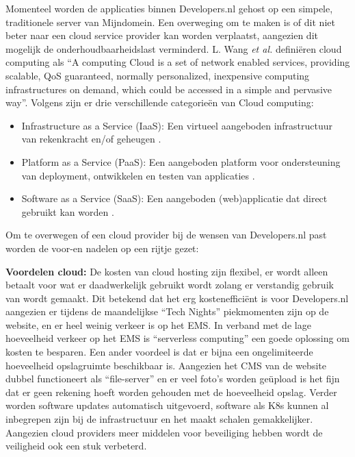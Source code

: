 Momenteel worden de applicaties binnen Developers.nl gehost op een simpele, traditionele server van Mijndomein. Een overweging om te maken is of dit niet beter naar een cloud service provider kan worden verplaatst, aangezien dit mogelijk de onderhoudbaarheidslast verminderd. L. Wang \textit{et al.} \parencite{CloudPerspective} definiëren cloud computing als \enquote{A computing Cloud is a set of network enabled services, providing scalable, QoS guaranteed, normally personalized, inexpensive computing infrastructures on demand, which could be accessed in a simple and pervasive way}. Volgens \parencite{CloudPlatformsIntroduction} zijn er drie verschillende categorieën van Cloud computing:
\begin{itemize}
	\item Infrastructure as a Service (IaaS): Een virtueel aangeboden infrastructuur van rekenkracht en/of geheugen \parencite{CloudComputingAdvantages}.
	\item Platform as a Service (PaaS): Een aangeboden platform voor ondersteuning van deployment, ontwikkelen en testen van applicaties \parencite{TransformingCloud}.
	\item Software as a Service (SaaS): Een aangeboden (web)applicatie dat direct gebruikt kan worden \parencite{CloudComputingAdvantages}.
\end{itemize}

Om te overwegen of een cloud provider bij de wensen van Developers.nl past worden de voor-en nadelen op een rijtje gezet:

\textbf{Voordelen cloud:} De kosten van cloud hosting zijn flexibel, er wordt alleen betaalt voor wat er daadwerkelijk gebruikt wordt zolang er verstandig gebruik van wordt gemaakt. Dit betekend dat het erg kostenefficiënt is voor Developers.nl aangezien er tijdens de maandelijkse \enquote{Tech Nights} piekmomenten zijn op de website, en er heel weinig verkeer is op het EMS. In verband met de lage hoeveelheid verkeer op het EMS is \enquote{serverless computing} een goede oplossing om kosten te besparen. Een ander voordeel is dat er bijna een ongelimiteerde hoeveelheid opslagruimte beschikbaar is. Aangezien het CMS van de website dubbel functioneert als \enquote{file-server} en er veel foto's worden geüpload is het fijn dat er geen rekening hoeft worden gehouden met de hoeveelheid opslag. Verder worden software updates automatisch uitgevoerd, software als K8s kunnen al inbegrepen zijn bij de infrastructuur en het maakt schalen gemakkelijker. Aangezien cloud providers meer middelen voor beveiliging hebben wordt de veiligheid ook een stuk verbeterd.

